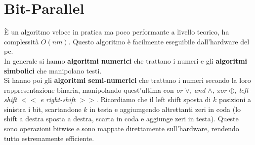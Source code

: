 \documentclass[a4paper,12pt, oneside]{book}
\begin{document}
\section{Bit-Parallel}
È un algoritmo veloce in pratica ma poco performante a livello
teorico, ha complessità $O(nm)$.
Questo algoritmo è facilmente eseguibile dall'hardware del pc. \\
In generale si hanno \textbf{algoritmi numerici} che trattano i numeri
e gli \textbf{algoritmi simbolici} che manipolano testi.\\
Si hanno poi gli\textbf{ algoritmi semi-numerici} che trattano i
numeri secondo la loro rappresentazione binaria, manipolando quest'ultima
con \textit{or $\vee$, and $\wedge$, xor $\oplus$, left-shift $<<$ e
  right-shift $>>$}. Ricordiamo che il left shift sposta di $k$
posizioni a sinistra i bit, scartandone $k$ in testa e aggiumgendo
altrettanti zeri in coda (lo shift a destra sposta a destra, scarta in
coda e aggiunge zeri in testa). Queste sono operazioni bitwise e sono
mappate direttamente sull'hardware, rendendo tutto estremamente
efficiente.\\
\end{document}
